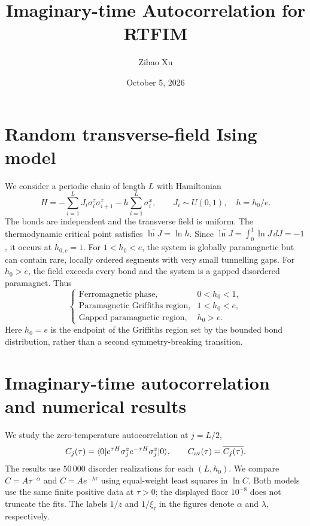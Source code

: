 \documentclass[a4paper,11pt]{article}
\title{Imaginary-time Autocorrelation for RTFIM}
\author{Zihao Xu}
\date{October 5, 2026}
\begin{document}
\maketitle
\vspace{-2em}

\section{Random transverse-field Ising model}
We consider a periodic chain of length $L$ with Hamiltonian
\begin{equation}
 H=-\sum_{i=1}^{L}J_i\sigma_i^z\sigma_{i+1}^z
   -h\sum_{i=1}^{L}\sigma_i^x,
 \qquad J_i\sim U(0,1),\quad h=h_0/e.
\end{equation}
The bonds are independent and the transverse field is uniform. The
thermodynamic critical point satisfies $\overline{\ln J}=\ln h$.
Since $\overline{\ln J}=\int_0^1\ln J\,dJ=-1$, it occurs at $h_{0,c}=1$.
For $1<h_0<e$, the system is globally paramagnetic but can contain rare,
locally ordered segments with very small tunnelling gaps. For $h_0>e$,
the field exceeds every bond and the system is a gapped disordered
paramagnet. Thus
\begin{equation}
 \begin{cases}
  \text{Ferromagnetic phase}, & 0<h_0<1,\\
  \text{Paramagnetic Griffiths region}, & 1<h_0<e,\\
  \text{Gapped paramagnetic region}, & h_0>e.
 \end{cases}
\end{equation}
Here $h_0=e$ is the endpoint of the Griffiths region set by the bounded
bond distribution, rather than a second symmetry-breaking transition.

\section{Imaginary-time autocorrelation and numerical results}
We study the zero-temperature autocorrelation at $j=L/2$,
\begin{equation}
 C_j(\tau)=\langle0|e^{\tau H}\sigma_j^z e^{-\tau H}\sigma_j^z|0\rangle,
 \qquad C_{\rm av}(\tau)=\overline{C_j(\tau)}.
 \label{eq:c}
\end{equation}
The results use $50\,000$ disorder realizations for each $(L,h_0)$.
We compare $C=A\tau^{-\alpha}$ and $C=Ae^{-\lambda\tau}$ using equal-weight
least squares in $\ln C$. Both models use the same finite positive data
at $\tau>0$; the displayed floor $10^{-8}$ does not truncate the fits.
The labels $1/z$ and $1/\xi_\tau$ in the figures denote $\alpha$ and
$\lambda$, respectively.
\end{document}

